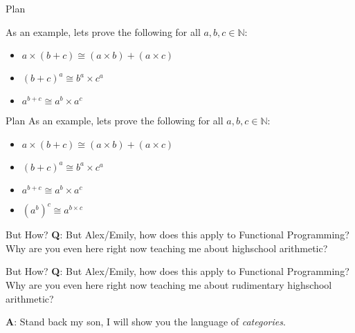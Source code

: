 \documentclass[tikz]{beamer}
\theoremstyle{definition}
\begin{document}
\begin{frame}{Plan}

As an example, lets prove the following for all $a, b, c \in \mathbb{N}$:

\begin{itemize}
    \item $a \times (b + c) \cong (a \times b) + (a \times c)$
    \item $(b + c)^a \cong b^a \times c^a$
    \item $a^{b + c} \cong a^b \times a^c$
\end{itemize}
\end{frame}

\begin{frame}{Plan}
As an example, lets prove the following for all $a, b, c \in \mathbb{N}$:

\begin{itemize}

    \item $a \times (b + c) \cong (a \times b) + (a \times c)$
    \item $(b + c)^a \cong b^a \times c^a$
    \item $a^{b + c} \cong a^b \times a^c$
    \item $(a^b)^c \cong a^{b\times c}$
\end{itemize}
    
\end{frame}{}
\begin{frame}{But How?}
    \textbf{Q}: But Alex/Emily, how does this apply to Functional Programming? Why are you even here right now teaching me about highschool arithmetic? 
    
    
\end{frame}{}

\begin{frame}{But How?}
    \textbf{Q}: But Alex/Emily, how does this apply to Functional Programming? Why are you even here right now teaching me about rudimentary highschool arithmetic? 
    
    \textbf{A}: Stand back my son, I will show you the language of \textit{categories}. 
    
\end{frame}{}
\end{document}
